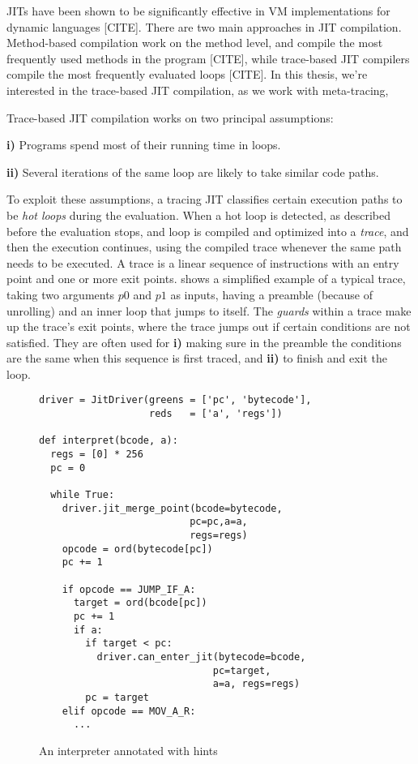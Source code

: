 JITs have been shown to be significantly effective in VM
implementations for dynamic languages [CITE]. There are two main
approaches in JIT compilation. Method-based compilation work on the
method level, and compile the most frequently used methods in the
program [CITE], while trace-based JIT compilers compile the most
frequently evaluated loops [CITE]. In this thesis, we're interested in
the trace-based JIT compilation, as we work with meta-tracing,

Trace-based JIT compilation works on two principal assumptions:

\textbf{i)} Programs spend most of their running time in loops.

\textbf{ii)} Several iterations of the same loop are likely to take
similar code paths.

To exploit these assumptions, a tracing JIT classifies certain
execution paths to be \emph{hot loops} during the evaluation. When a
hot loop is detected, as described before the evaluation stops, and
loop is compiled and optimized into a \emph{trace}, and then the
execution continues, using the compiled trace whenever the same path
needs to be executed. A trace is a linear sequence of instructions
with an entry point and one or more exit points. 
shows a simplified example of a typical trace, taking two arguments
$p0$ and $p1$ as inputs, having a preamble (because of unrolling) and
an inner loop that jumps to itself. The \emph{guards} within a trace
make up the trace's exit points, where the trace jumps out if certain
conditions are not satisfied. They are often used for \textbf{i)}
making sure in the preamble the conditions are the same when this
sequence is first traced, and \textbf{ii)} to finish and exit the
loop.

  \begin{wrapfigure}[21]{r}{0.35\textwidth}
    \vspace{-0.5cm}
    \centering
    \begin{minipage}[t]{0.32\textwidth}
      \begin{verbatim}
driver = JitDriver(greens = ['pc', 'bytecode'],
                   reds   = ['a', 'regs'])

def interpret(bcode, a):
  regs = [0] * 256
  pc = 0

  while True:
    driver.jit_merge_point(bcode=bytecode,
                          pc=pc,a=a,
                          regs=regs)
    opcode = ord(bytecode[pc])
    pc += 1

    if opcode == JUMP_IF_A:
      target = ord(bcode[pc])
      pc += 1
      if a:
        if target < pc:
          driver.can_enter_jit(bytecode=bcode,
                              pc=target,
                              a=a, regs=regs)
        pc = target
    elif opcode == MOV_A_R:
      ...
    \end{verbatim}
    \end{minipage}
    \caption{\small An interpreter annotated with hints \cite{bolz09}}
    \label{fig:rpython-interp}
  \end{wrapfigure}

